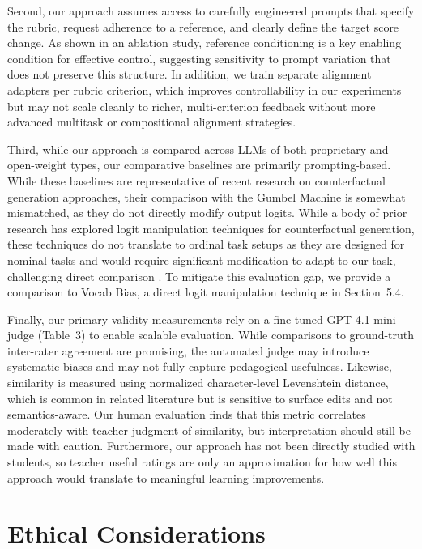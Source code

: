 \documentclass[letterpaper]{article} %
\begin{document}
Second, our approach assumes access to carefully engineered prompts that specify the rubric, request adherence to a reference, and clearly define the target score change. As shown in an ablation study, reference conditioning is a key enabling condition for effective control, suggesting sensitivity to prompt variation that does not preserve this structure. In addition, we train separate alignment adapters per rubric criterion, which improves controllability in our experiments but may not scale cleanly to richer, multi-criterion feedback without more advanced multitask or compositional alignment strategies.

Third, while our approach is compared across LLMs of both proprietary and open-weight types, our comparative baselines are primarily prompting-based. While these baselines are representative of recent research on counterfactual generation approaches, their comparison with the Gumbel Machine is somewhat mismatched, as they do not directly modify output logits. While a body of prior research has explored logit manipulation techniques for counterfactual generation, these techniques do not translate to ordinal task setups as they are designed for nominal tasks and would require significant modification to adapt to our task, challenging direct comparison \cite{krause2021gedi, yang2021fudge, dathathri_plug_2019}. To mitigate this evaluation gap, we provide a comparison to Vocab Bias, a direct logit manipulation technique in Section~5.4.

Finally, our primary validity measurements rely on a fine-tuned GPT-4.1-mini judge (Table~3) to enable scalable evaluation. While comparisons to ground-truth inter-rater agreement are promising, the automated judge may introduce systematic biases and may not fully capture pedagogical usefulness. Likewise, similarity is measured using normalized character-level Levenshtein distance, which is common in related literature but is sensitive to surface edits and not semantics-aware. Our human evaluation finds that this metric correlates moderately with teacher judgment of similarity, but interpretation should still be made with caution. Furthermore, our approach has not been directly studied with students, so teacher useful ratings are only an approximation for how well this approach would translate to meaningful learning improvements.

\section{Ethical Considerations}
\end{document}

